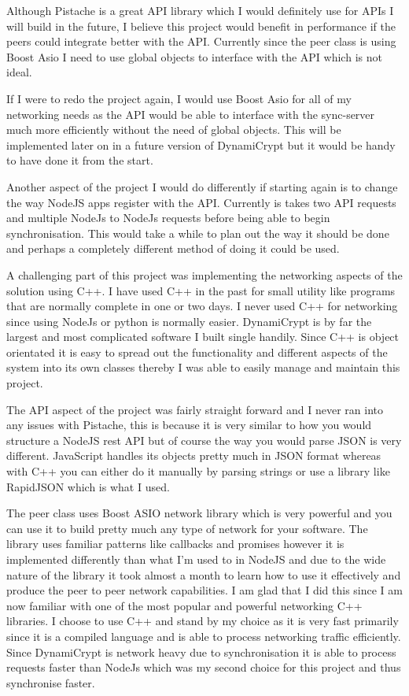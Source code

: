 Although Pistache is a great API library which I would definitely use for APIs I will build in the future, I believe this project would benefit in performance if the peers could integrate better with the API. Currently since the peer class is using Boost Asio I need to use global objects to interface with the API which is not ideal.

If I were to redo the project again, I would use Boost Asio for all of my networking needs as the API would be able to interface with the sync-server much more efficiently without the need of global objects. This will be implemented later on in a future version of DynamiCrypt but it would be handy to have done it from the start.

Another aspect of the project I would do differently if starting again is to change the way NodeJS apps register with the API. Currently is takes two API requests and multiple NodeJs to NodeJs requests before being able to begin synchronisation. This would take a while to plan out the way it should be done and perhaps a completely different method of doing it could be used.

A challenging part of this project was implementing the networking aspects of the solution using C++. I have used C++ in the past for small utility like programs that are normally complete in one or two days. I never used C++ for networking since using NodeJs or python is normally easier. DynamiCrypt is by far the largest and most complicated software I built single handily. Since C++ is object orientated it is easy to spread out the functionality and different aspects of the system into its own classes thereby I was able to easily manage and maintain this project. 

The API aspect of the project was fairly straight forward and I never ran into any issues with Pistache, this is because it is very similar to how you would structure a NodeJS rest API but of course the way you would parse JSON is very different. JavaScript handles its objects pretty much in JSON format whereas with C++ you can either do it manually by parsing strings or use a library like RapidJSON which is what I used. 

The peer class uses Boost ASIO network library which is very powerful and you can use it to build pretty much any type of network for your software. The library uses familiar patterns like callbacks and promises however it is implemented differently than what I'm used to in NodeJS and due to the wide nature of the library it took almost a month to learn how to use it effectively and produce the peer to peer network capabilities. I am glad that I did this since I am now familiar with one of the most popular and powerful networking C++ libraries. I choose to use C++ and stand by my choice as it is very fast primarily since it is a compiled language and is able to process networking traffic efficiently. Since DynamiCrypt is network heavy due to synchronisation it is able to process requests faster than NodeJs which was my second choice for this project and thus synchronise faster.        




